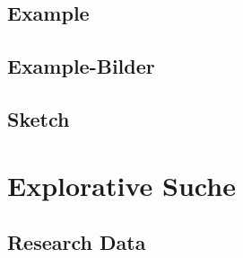 \documentclass[a4paper, 11pt, accentcolor = tud3b]{tudreport}
\begin{document}
			\subsection{Example} %

			\subsection{Example-Bilder} %

			\subsection{Sketch} %

		\section{Explorative Suche} %

			\subsection{Research Data} %
\end{document}
